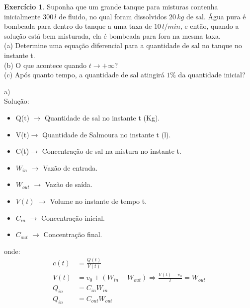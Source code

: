 \documentclass[a4paper,12pt,reqno,natbib]{amsart}
\theoremstyle{definition}
\newtheorem{exercise}{Exerc\'icio}
\begin{document}
\begin{exercise}
Suponha que um grande tanque para misturas contenha inicialmente $300\,l$ de fluido, no qual foram dissolvidos $20\,kg$ de sal. Água pura é bombeada para dentro do tanque a uma taxa de $10\,l/min$, e então, quando a solução está bem misturada, ela é bombeada para fora na mesma taxa. \\
(a) Determine uma equação diferencial para a quantidade de sal no tanque no instante t. \\
(b) O que acontece quando $t \rightarrow +\infty$? \\
(c) Após quanto tempo, a quantidade de sal atingirá $1\%$ da quantidade inicial?
\end{exercise}
a)\\
Solu\c c\~ao:
\begin{itemize}
	\item Q(t) $\rightarrow$ Quantidade de sal no instante t (Kg).
	\item V(t)$\rightarrow$ Quantidade de Salmoura no instante t (l).
	\item C(t)$\rightarrow$ Concentra\c c\~ao de sal na mistura no instante t.
	\item $W_{in}$ $\rightarrow$ Vaz\~ao de entrada.
	\item $W_{out}$ $\rightarrow$ Vaz\~ao de sa\'ida.
	\item $V(t)$ $\rightarrow$ Volume no instante de tempo t.
	\item $C_{in}$ $\rightarrow$ Concentra\c c\~ao inicial.
	\item $C_{out}$ $\rightarrow$ Concentra\c c\~ao final.
\end{itemize}
onde:
\begin{align*}
	c(t) &= \frac{Q(t)}{V(t)} \\
	V(t) &= v_0 + (W_{in} - W_{out}) \Rightarrow \frac{V(t) - v_0}{t} = W_{out}\\
	Q_{in} &= C_{in} W_{in} \\
	Q_{in} &= C_{out} W_{out} 
\end{align*}
\end{document}

